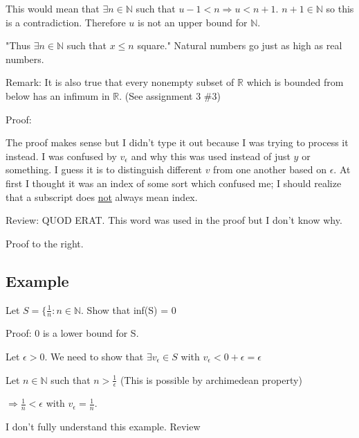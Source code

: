 \documentclass{article}
\begin{document}
This would mean that $\exists n \in \mathbb{N}$ such that $u - 1 < n \Rightarrow u < n + 1$. $n + 1 \in \mathbb{N}$ so this is a contradiction. Therefore $u$ is not an upper bound for $\mathbb{N}$.

"Thus $\exists n \in \mathbb{N}$ such that $x \leq n$ square." Natural numbers go just as high as real numbers.

Remark: It is also true that every nonempty subset of $\mathbb{R}$ which is bounded from below has an infimum in $\mathbb{R}$. (See assignment 3 \#3)


Proof:

The proof makes sense but I didn't type it out because I was trying to process it instead. I was confused by $v_\epsilon$ and why this was used instead of just $y$ or something. I guess it is to distinguish different $v$ from one another based on $\epsilon$. At first I thought it was an index of some sort which confused me; I should realize that a subscript does \underline{not} always mean index.

Review: QUOD ERAT. This word was used in the proof but I don't know why.

Proof to the right.

\subsection{Example}

Let $S = \{\frac{1}{n}: n \in \mathbb{N}$. Show that inf(S) = 0

Proof: 0 is a lower bound for S.

Let $\epsilon > 0$. We need to show that $\exists v_\epsilon \in S$ with $v_\epsilon < 0 + \epsilon = \epsilon$

Let $n \in \mathbb{N}$ such that $n > \frac{1}{\epsilon}$ (This is possible by archimedean property)

$\Rightarrow \frac{1}{n} < \epsilon$ with $v_\epsilon = \frac{1}{n}$.

I don't fully understand this example. Review
\end{document}
